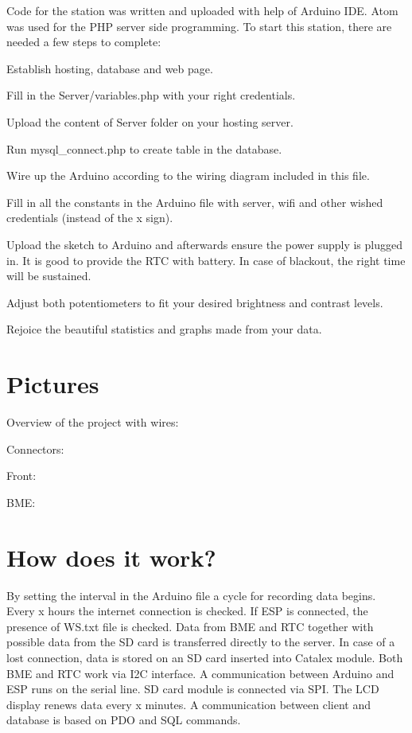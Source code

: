 Code for the station was written and uploaded with help of Arduino I\+DE. Atom was used for the P\+HP server side programming. To start this station, there are needed a few steps to complete\+:
\begin{DoxyEnumerate}
\item Establish hosting, database and web page.
\item Fill in the Server/variables.\+php with your right credentials.
\item Upload the content of Server folder on your hosting server.
\item Run mysql\+\_\+connect.\+php to create table in the database.
\item Wire up the Arduino according to the wiring diagram included in this file.
\item Fill in all the constants in the Arduino file with server, wifi and other wished credentials (instead of the x sign).
\item Upload the sketch to Arduino and afterwards ensure the power supply is plugged in. It is good to provide the R\+TC with battery. In case of blackout, the right time will be sustained.
\item Adjust both potentiometers to fit your desired brightness and contrast levels.
\item Rejoice the beautiful statistics and graphs made from your data.
\end{DoxyEnumerate}

\section*{Pictures}

Overview of the project with wires\+: 

Connectors\+: 

Front\+: 

B\+ME\+: 

\section*{How does it work?}

By setting the interval in the Arduino file a cycle for recording data begins. Every x hours the internet connection is checked. If E\+SP is connected, the presence of W\+S.\+txt file is checked. Data from B\+ME and R\+TC together with possible data from the SD card is transferred directly to the server. In case of a lost connection, data is stored on an SD card inserted into Catalex module. Both B\+ME and R\+TC work via I2C interface. A communication between Arduino and E\+SP runs on the serial line. SD card module is connected via S\+PI. The L\+CD display renews data every x minutes. A communication between client and database is based on P\+DO and S\+QL commands.

